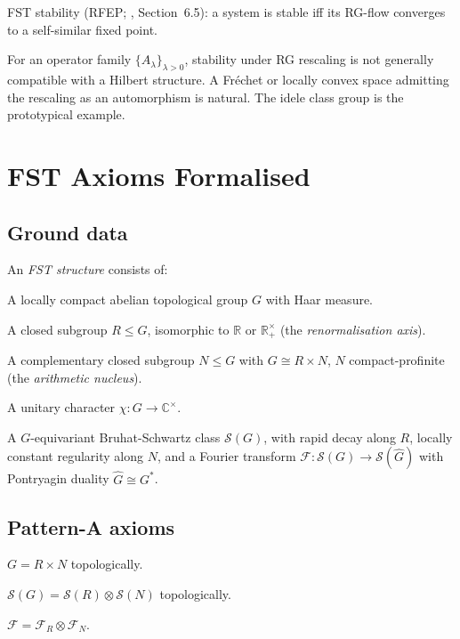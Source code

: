 \documentclass[11pt,a4paper]{article}
\theoremstyle{plain}
\theoremstyle{definition}
\newcommand{\C}{\mathbb{C}}
\newcommand{\R}{\mathbb{R}}
\renewcommand{\S}{\mathcal{S}}
\newcommand{\chifn}{\chi}
\begin{document}
FST stability (RFEP; \cite{MathMaster}, Section~6.5): a system is stable iff its RG-flow
converges to a self-similar fixed point.

For an operator family $\{A_\lambda\}_{\lambda > 0}$, stability
under RG rescaling is not generally compatible with a Hilbert
structure.  A Fr\'echet or locally convex space admitting the
rescaling as an automorphism is natural.  The idele class group is
the prototypical example.

\section{FST Axioms Formalised}
\label{sec:axioms}

\subsection{Ground data}

An \emph{FST structure} consists of:

\begin{description}[style=nextline]
\item[(G)] A locally compact abelian topological group $G$ with
  Haar measure.
\item[(R)] A closed subgroup $R \leq G$, isomorphic to $\R$ or
  $\R_+^\times$ (the \emph{renormalisation axis}).
\item[(N)] A complementary closed subgroup $N \leq G$ with $G
  \cong R \times N$, $N$ compact-profinite (the \emph{arithmetic
  nucleus}).
\item[($\chifn$)] A unitary character $\chifn : G \to \C^\times$.
\item[(S)] A $G$-equivariant Bruhat-Schwartz class $\S(G)$, with
  rapid decay along $R$, locally constant regularity along $N$,
  and a Fourier transform $\mathcal F : \S(G) \to \S(\hat G)$
  with Pontryagin duality $\hat G \cong G^\ast$.
\end{description}

\subsection{Pattern-A axioms}

\begin{description}[style=nextline]
\item[(P1)] $G = R \times N$ topologically.
\item[(P2)] $\S(G) = \S(R) \otimes \S(N)$ topologically.
\item[(P3)] $\mathcal F = \mathcal F_R \otimes \mathcal F_N$.
\end{description}
\end{document}
